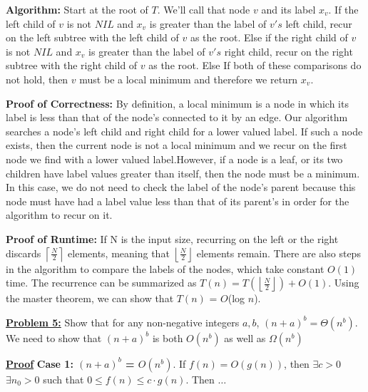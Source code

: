 \documentclass[11pt]{article}
\begin{document}
\begin{flushleft}
		\textbf{Algorithm:} Start at the root of $T$. We'll call that node $v$ and its label $x_v$. If the left child of $v$ is not $NIL$ and $x_v$ is greater than the label of $v's$ left child, recur on the left subtree with the left child of $v$ as the root. Else if the right child of $v$ is not $NIL$ and $x_v$ is greater than the label of $v's$ right child, recur on the right subtree with the right child of $v$ as the root. Else If both of these comparisons do not hold, then $v$ must be a local minimum and therefore we return $x_v$. 
		\newline
		
		\textbf{Proof of Correctness:} By definition, a local minimum is a node in which its label is less than that of the node's connected to it by an edge. Our algorithm searches a node's left child and right child for a lower valued label. If such a node exists, then the current node is not a local minimum and we recur on the first node we find with a lower valued label.\newline However, if a node is a leaf, or its two children have label values greater than itself, then the node must be a minimum. In this case, we do not need to check the label of the node's parent because this node must have had a label value less than that of its parent's in order for the algorithm to recur on it.   
		\newpage
		
		\textbf{Proof of Runtime:} If N is the input size, recurring on the left or the right discards $\left\lceil\frac{N}{2}\right\rceil$ elements, meaning that $\left\lfloor\frac{N}{2}\right\rfloor$ elements remain. There are also steps in the algorithm to compare the labels of the nodes, which take constant $O(1)$ time. The recurrence can be summarized as $T(n) = T(\left\lfloor\frac{N}{2}\right\rfloor) + O(1)$. Using the master theorem, we can show that $T(n)$ = $O$(log $n$).
		\vspace{0.2cm}
		
		\item \textbf {\underline{Problem 5:}} Show that for any non-negative integers $a,b$,
		$(n+a)^b = \Theta(n^b).$\newline
		We need to show that $(n+a)^b$ is both $O(n^b)$ as well as $\Omega(n^b)$
		
		\textbf{\underline{Proof}}\newline
		\textbf{Case 1: $(n+a)^b$ = $O(n^b)$}. \newline
		If $f(n) = O(g(n))$, then $\exists c > 0$ $\exists n_0 > 0$ such that 
		$0 \leq f(n) \leq c \cdot g(n)$. Then $\dots$
		

\end{flushleft}
\end{document}
